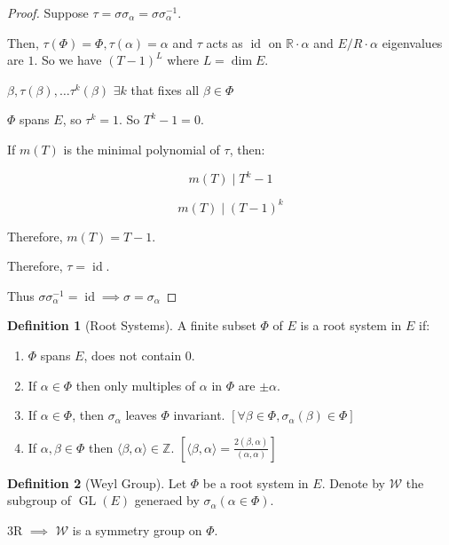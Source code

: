 \documentclass{article}
\theoremstyle{definition}
\newtheorem*{definition}{Definition}
\begin{document}
\begin{proof}
    Suppose \(\tau = \sigma \sigma_\alpha = \sigma \sigma _\alpha ^{-1} \).

    Then, \(\tau(\Phi) = \Phi , \tau (\alpha ) = \alpha\) and \(\tau\) acts as \(\operatorname{id}\) on \(\mathbb{R} \cdot \alpha\) and \(E / R\cdot \alpha\) eigenvalues are \(1\). So we have \((T-1)^L\) where \(L = \dim E\).
    
    \(\beta , \tau (\beta), \dots \tau^k(\beta)\) \(\exists k\) that fixes all \(\beta \in \Phi \) 

    \(\Phi\) spans \(E\), so \(\tau ^ k = 1\). So \(T^k - 1 = 0\).

    If \(m(T)\) is the minimal polynomial of \(\tau\), then:

    \[
        m(T) \mid T^k - 1
    \]

    \[
        m(T) \mid (T-1)^k
    \]

    Therefore, \(m(T) = T - 1\).
    
    Therefore, \(\tau = \operatorname{id}\).

    Thus \(\sigma \sigma_\alpha ^{-1} = \operatorname{id} \implies \sigma = \sigma_\alpha \) 
\end{proof}

\begin{definition}
    [Root Systems]

    A finite subset \(\Phi\) of \(E\) is a root system in \(E\) if:

    \begin{enumerate}[label=\arabic*R)]
        \item \(\Phi\) spans \(E\), does not contain \(0\).
        \item If \(\alpha \in \Phi\) then only multiples of \(\alpha\) in \(\Phi\) are \(\pm \alpha\).
        \item If \(\alpha \in \Phi\), then \(\sigma_\alpha\) leaves \(\Phi\) invariant. \([\forall \beta \in \Phi, \sigma_\alpha (\beta)\in \Phi ]\) 
        \item If \(\alpha ,\beta \in \Phi \) then \(\langle \beta , \alpha  \rangle \in \mathbb{Z} \). \(\left[ \langle \beta , \alpha  \rangle = \frac{2(\beta,\alpha)}{(\alpha ,\alpha )} \right] \) 
    \end{enumerate} 
\end{definition}

\begin{definition}
    [Weyl Group]

    Let \(\Phi\) be a root system in \(E\). Denote by \(\mathcal{W}\) the subgroup of \(\operatorname{GL}(E)\) generaed by \(\sigma_\alpha (\alpha \in \Phi)\). 

    3R \(\implies\) \(\mathcal{W}\) is a symmetry group on \(\Phi\). 
\end{definition}
\end{document}
